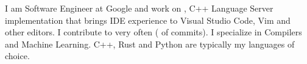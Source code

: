 
\begin{cvparagraph}
I am Software Engineer at Google and work on
  , C++ Language Server implementation
that brings IDE experience to Visual Studio Code, Vim and other editors. I
contribute to  very often
(
of commits). I specialize in Compilers and Machine Learning. C++, Rust and
Python are typically my languages of choice.
\end{cvparagraph}
